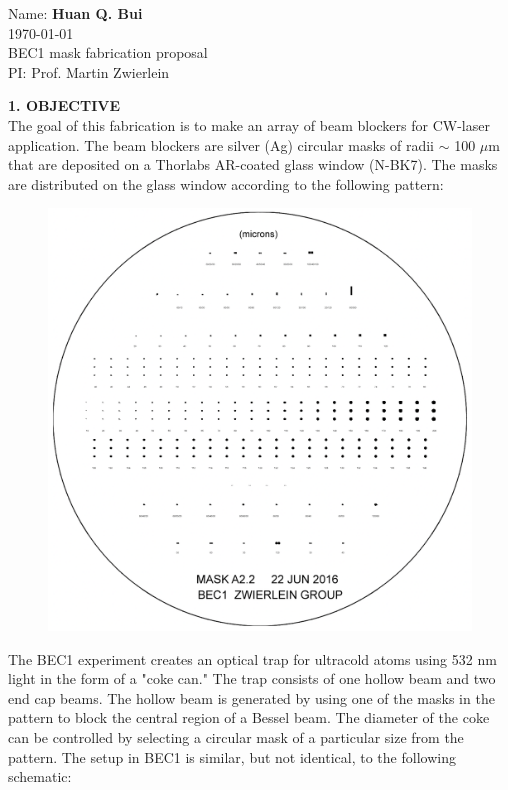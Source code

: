 \documentclass{article}
\theoremstyle{definition}
\begin{document}
\begin{framed}
\noindent Name: \textbf{Huan Q. Bui}\\
\today \\
BEC1 mask fabrication proposal \\
PI: Prof. Martin Zwierlein
\end{framed}


\noindent \textbf{1. OBJECTIVE}\\

\noindent The goal of this fabrication is to make an array of beam blockers for CW-laser application. The beam blockers are silver (Ag) circular masks of radii $\sim$ 100 $\mu$m that are deposited on a Thorlabs AR-coated glass window (N-BK7). The masks are distributed on the glass window according to the following pattern:

\begin{figure}[!htb]
\centering
\includegraphics[scale=0.35]{masks.png}
\end{figure}

The BEC1 experiment creates an optical trap for ultracold atoms using 532 nm light in the form of a "coke can." The trap consists of one hollow beam and two end cap beams. The hollow beam is generated by using one of the masks in the pattern to block the central region of a Bessel beam. The diameter of the coke can be controlled by selecting a circular mask of a particular size from the pattern. The setup in BEC1 is similar, but not identical, to the following schematic:
\end{document}
